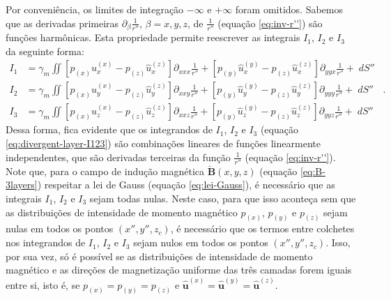Por conveniência, os limites de integração $-\infty$ e $+\infty$ foram omitidos.
Sabemos que as derivadas primeiras $\partial_{\beta} \frac{1}{r''}$, $\beta = x, y, z$, de 
$\frac{1}{r''}$ (equação \ref{eq:inv-r''}) são funções harmônicas. Esta propriedade permite 
reescrever as integrais $I_{1}$, $I_{2}$ e $I_{3}$ da seguinte forma:
\begin{equation}
\begin{split}
I_{1} &= \gamma_{m} \iint
\left[ p_{(x)} \hat{u}^{(x)}_{x} - p_{(z)} \hat{u}^{(z)}_{x} \right] \partial_{xxx} \frac{1}{r''} +
\left[ p_{(y)} \hat{u}^{(y)}_{x} - p_{(z)} \hat{u}^{(z)}_{x} \right] \partial_{yyx} \frac{1}{r''} +
\; dS'' \\
I_{2} &= \gamma_{m} \iint
\left[ p_{(x)} \hat{u}^{(x)}_{y} - p_{(z)} \hat{u}^{(z)}_{y} \right] \partial_{xxy} \frac{1}{r''} +
\left[ p_{(y)} \hat{u}^{(y)}_{y} - p_{(z)} \hat{u}^{(z)}_{y} \right] \partial_{yyy} \frac{1}{r''} +
\; dS'' \\
I_{3} &= \gamma_{m} \iint
\left[ p_{(x)} \hat{u}^{(x)}_{z} - p_{(z)} \hat{u}^{(z)}_{z} \right] \partial_{xxz} \frac{1}{r''} +
\left[ p_{(y)} \hat{u}^{(y)}_{z} - p_{(z)} \hat{u}^{(z)}_{z} \right] \partial_{yyz} \frac{1}{r''} +
\; dS''
\label{eq:divergent-layer-I123}
\end{split} \:\: .
\end{equation}
Dessa forma, fica evidente que os integrandos de $I_{1}$, $I_{2}$ e $I_{3}$ (equação \ref{eq:divergent-layer-I123}) 
são combinações lineares de funções linearmente independentes, que são derivadas 
terceiras da função $\frac{1}{r''}$ (equação \ref{eq:inv-r''}).
Note que, para o campo de indução magnética $\breve{\mathbf{B}}(x, y, z)$ (equação \ref{eq:B-3layers}) 
respeitar a lei de Gauss (equação \ref{eq:lei-Gauss}), é necessário que as integrais $I_{1}$, $I_{2}$ e $I_{3}$ 
sejam todas nulas.
Neste caso, para que isso aconteça sem que as distribuições de intensidade de momento magnético 
$p_{(x)}$, $p_{(y)}$ e $p_{(z)}$ sejam nulas em todos os pontos $(x'', y'', z_{c})$, é necessário 
que os termos entre colchetes
nos integrandos de $I_{1}$, $I_{2}$ e $I_{3}$ sejam nulos em todos os pontos $(x'', y'', z_{c})$.
Isso, por sua vez, só é possível se as distribuições de intensidade de momento magnético 
e as direções de magnetização uniforme das três camadas forem iguais entre si, isto é, se 
$p_{(x)} = p_{(y)} = p_{(z)}$ e 
$\hat{\mathbf{u}}^{(x)} = \hat{\mathbf{u}}^{(y)} = \hat{\mathbf{u}}^{(z)}$.

